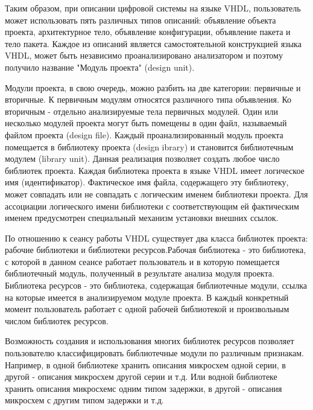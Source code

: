 Таким образом, при описании цифровой системы на языке VHDL,  пользователь может использовать пять различных типов описаний: объявление объекта проекта, архитектурное тело, объявление конфигурации, объявление пакета и тело пакета. Каждое из описаний является самостоятельной конструкцией языка  VHDL, может быть независимо проанализировано анализатором и поэтому получило название "Модуль проекта" (design unit).

Модули проекта, в свою очередь, можно разбить на две категории: первичные и вторичные. К первичным модулям относятся различного типа объявления. Ко вторичным  -  отдельно анализируемые тела первичных модулей. Один или несколько модулей проекта могут быть помещены в один файл, называемый файлом проекта (design file). Каждый проанализированный модуль проекта помещается в библиотеку проекта (design ibrary) и становится библиотечным модулем (library unit). Данная реализация позволяет создать любое число библиотек проекта. Каждая библиотека проекта в языке  VHDL имеет логическое имя (идентификатор). Фактическое имя файла, содержащего эту библиотеку, может совпадать или не совпадать с логическим именем библиотеки проекта. Для ассоциации логического имени библиотеки с соответствующим ей фактическим именем предусмотрен специальный механизм установки внешних ссылок.

По отношению к сеансу работы  VHDL существует два класса библиотек проекта: рабочие библиотеки и библиотеки ресурсов.Рабочая библиотека  -  это библиотека, с которой в данном сеансе работает пользователь и в которую помещается библиотечный модуль, полученный в результате анализа модуля проекта. Библиотека ресурсов  -  это библиотека, содержащая библиотечные модули, ссылка на которые имеется в анализируемом модуле проекта. В каждый конкретный момент пользователь работает с одной рабочей библиотекой и произвольным числом библиотек ресурсов.

Возможность создания и использования многих библиотек ресурсов позволяет пользователю классифицировать библиотечные модули по различным признакам. Например, в одной библиотеке хранить описания микросхем одной серии, в другой  -  описания микросхем другой серии и т.д.    Или водной библиотеке хранить описания микросхемс одним типом задержки,  в другой  -  описания микросхем с другим типом задержки и т.д.
